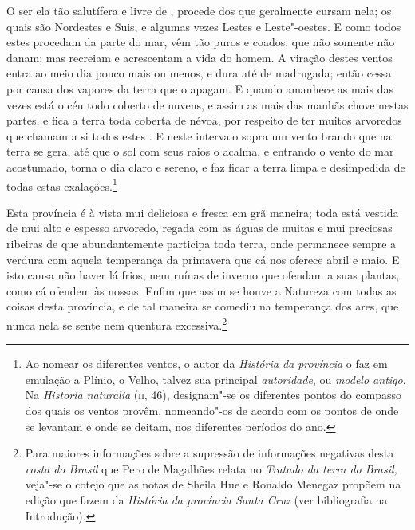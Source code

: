 O ser ela tão salutífera e livre de , procede dos  que		
geralmente cursam nela; os quais são Nordestes e Suis, e algumas vezes
Lestes e Leste"-oestes. E como todos estes procedam da parte do mar, vêm
tão puros e coados, que não somente não danam; mas recreiam e
acrescentam a vida do homem. A viração destes ventos entra ao meio dia
pouco mais ou menos, e dura até de madrugada; então cessa por causa dos
vapores da terra que o apagam. E quando amanhece as mais das vezes está
o céu todo coberto de nuvens, e assim as mais das manhãs chove nestas				%
partes, e fica a terra toda coberta de névoa, por respeito de ter
muitos arvoredos que chamam a si todos estes . E neste intervalo
sopra um vento brando que na terra se gera, até que o sol com seus
raios o acalma, e entrando o vento do mar acostumado, torna o dia claro
e sereno, e faz ficar a terra limpa e desimpedida de todas estas
exalações.\footnote{ Ao nomear os diferentes ventos, o autor da 
\textit{História da província} o faz em emulação a Plínio, o Velho, talvez
sua principal \textit{autoridade}, ou \textit{modelo antigo}. Na \textit{Historia naturalia} 
(\textsc{ii}, 46), designam"-se os diferentes pontos do compasso dos quais
os ventos provêm, nomeando"-os de acordo com os pontos de onde
se levantam e onde se deitam, nos diferentes períodos do ano.}

Esta província é à vista mui deliciosa e fresca em grã maneira; toda
está vestida de mui alto e espesso arvoredo, regada com as águas de
muitas e mui preciosas ribeiras de que abundantemente participa toda		%
terra, onde permanece sempre a verdura com aquela temperança da
primavera que cá nos oferece abril e maio. E isto causa não haver lá
frios, nem ruínas de inverno que ofendam a suas plantas, como cá
ofendem às nossas. Enfim que assim se houve a Natureza com todas as
coisas desta província, e de tal maneira se comediu na temperança dos
ares, que nunca nela se sente  nem quentura			%
excessiva.\footnote{ Para maiores informações sobre a supressão de
informações negativas desta \textit{costa do Brasil} que Pero de		
Magalhães relata no \textit{Tratado da terra do Brasil,} veja"-se o
cotejo que as notas de Sheila Hue e Ronaldo Menegaz propõem na 
edição que fazem da \textit{História da província Santa Cruz} (ver bibliografia na Introdução).}


